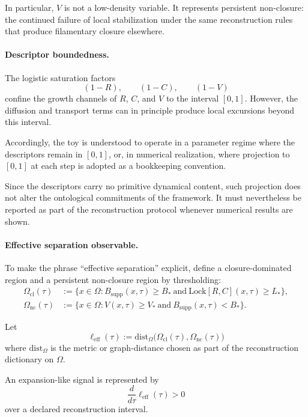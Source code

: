 \documentclass[aps,prx,onecolumn,11pt]{revtex4-2}
\theoremstyle{plain}
\theoremstyle{definition}
\theoremstyle{remark}
\begin{document}
In particular, \(V\) is not a low-density variable. It represents
persistent non-closure: the continued failure of local stabilization
under the same reconstruction rules that produce filamentary closure
elsewhere.

\paragraph{Descriptor boundedness.}

The logistic saturation factors
\[
(1-R),
\qquad
(1-C),
\qquad
(1-V)
\]
confine the growth channels of \(R\), \(C\), and \(V\) to the interval
\([0,1]\). However, the diffusion and transport terms can in principle
produce local excursions beyond this interval.

Accordingly, the toy is understood to operate in a parameter regime
where the descriptors remain in \([0,1]\), or, in numerical realization,
where projection to \([0,1]\) at each step is adopted as a bookkeeping
convention.

Since the descriptors carry no primitive dynamical content, such
projection does not alter the ontological commitments of the framework.
It must nevertheless be reported as part of the reconstruction protocol
whenever numerical results are shown.

\paragraph{Effective separation observable.}

To make the phrase ``effective separation'' explicit, define a
closure-dominated region and a persistent non-closure region by
thresholding:
\begin{align}
\Omega_{\mathrm{cl}}(\tau)
&:=
\{x\in\Omega:
B_{\mathrm{supp}}(x,\tau)\geq B_\ast
\ \text{and}\
\mathrm{Lock}[R,C](x,\tau)\geq L_\ast
\},
\\
\Omega_{\mathrm{nc}}(\tau)
&:=
\{x\in\Omega:
V(x,\tau)\geq V_\ast
\ \text{and}\
B_{\mathrm{supp}}(x,\tau)<B_\ast
\}.
\end{align}

Let
\[
\ell_{\mathrm{eff}}(\tau)
:=
\mathrm{dist}_{\Omega}
\bigl(
\Omega_{\mathrm{cl}}(\tau),
\Omega_{\mathrm{nc}}(\tau)
\bigr)
\label{eq:toy_sep_effective_distance}
\]
where \(\mathrm{dist}_{\Omega}\) is the metric or graph-distance chosen
as part of the reconstruction dictionary on \(\Omega\).

An expansion-like signal is represented by
\begin{equation}
\frac{d}{d\tau}
\ell_{\mathrm{eff}}(\tau)
>
0
\label{eq:toy_sep_expansion_signal}
\end{equation}
over a declared reconstruction interval.
\end{document}
